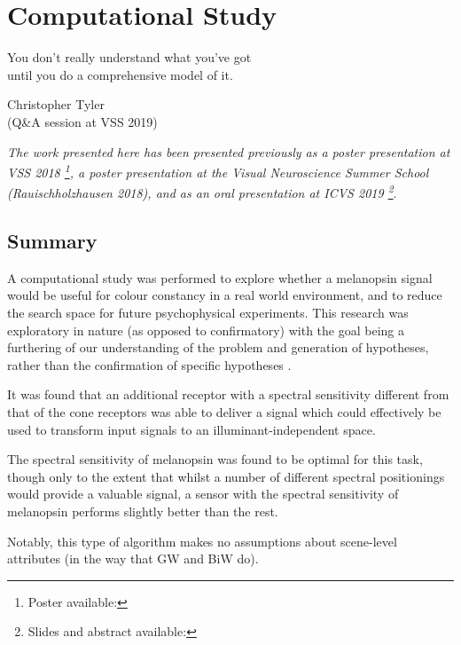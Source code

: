 \chapter{Computational Study}
\label{chap:Melcomp}

\begin{itquote}{}
You don't really understand what you've got \\
until you do a comprehensive model of it.
\end{itquote}

\begin{flushright}
Christopher Tyler \\ 
(Q\&A session at VSS 2019)
\end{flushright}

\textit{The work presented here has been presented previously as a poster presentation at VSS 2018 \citep{garside_does_2018}\footnote{Poster available: }, a poster presentation at the Visual Neuroscience Summer School (Rauischholzhausen 2018), and as an oral presentation at ICVS 2019 \footnote{Slides and abstract available: }}.

\section{Summary}

A computational study was performed to explore whether a melanopsin signal would be useful for colour constancy in a real world environment, and to reduce the search space for future psychophysical experiments. This research was exploratory in nature (as opposed to confirmatory) with the goal being a furthering of our understanding of the problem and generation of hypotheses, rather than the confirmation of specific hypotheses \citep{steinle_entering_1997}.

It was found that an additional receptor with a spectral sensitivity different from that of the cone receptors was able to deliver a signal which could effectively be used to transform input signals to an illuminant-independent space. 

The spectral sensitivity of melanopsin was found to be optimal for this task, though only to the extent that whilst a number of different spectral positionings would provide a valuable signal, a sensor with the spectral sensitivity of melanopsin performs slightly better than the rest.

Notably, this type of algorithm makes no assumptions about scene-level attributes (in the way that \acrlong{GW} and \acrlong{BiW} do).

